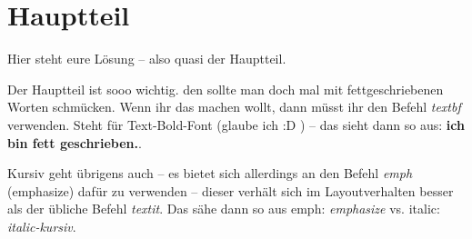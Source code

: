\section{Hauptteil}\label{sec:main}
Hier steht eure Lösung -- also quasi der Hauptteil.

Der Hauptteil ist sooo wichtig. den sollte man doch mal mit fettgeschriebenen Worten schmücken. Wenn ihr das machen wollt, dann müsst ihr den Befehl \emph{textbf} verwenden. Steht für Text-Bold-Font (glaube ich :D ) -- das sieht dann so aus: \textbf{ich bin fett geschrieben.}.

Kursiv geht übrigens auch -- es bietet sich allerdings an den Befehl \emph{emph} (emphasize) dafür zu verwenden -- dieser verhält sich im Layoutverhalten besser als der übliche Befehl \emph{textit}. Das sähe dann so aus emph: \emph{emphasize} vs. italic: \textit{italic-kursiv}.

